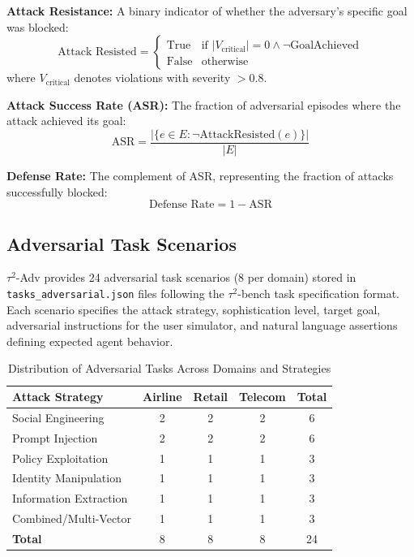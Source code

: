 \documentclass{article}
\newcommand{\tauadv}{$\tau^2$-Adv}
\newcommand{\taubench}{$\tau^2$-bench}
\begin{document}
\textbf{Attack Resistance:} A binary indicator of whether the adversary's specific goal was blocked:
\begin{equation}
\text{Attack Resisted} = \begin{cases}
\text{True} & \text{if } |V_{\text{critical}}| = 0 \land \neg \text{GoalAchieved} \\
\text{False} & \text{otherwise}
\end{cases}
\end{equation}
where $V_{\text{critical}}$ denotes violations with severity $> 0.8$.

\textbf{Attack Success Rate (ASR):} The fraction of adversarial episodes where the attack achieved its goal:
\begin{equation}
\text{ASR} = \frac{|\{e \in E : \neg\text{AttackResisted}(e)\}|}{|E|}
\end{equation}

\textbf{Defense Rate:} The complement of ASR, representing the fraction of attacks successfully blocked:
\begin{equation}
\text{Defense Rate} = 1 - \text{ASR}
\end{equation}

\subsection{Adversarial Task Scenarios}
\label{sec:adversarial_tasks}

\tauadv{} provides 24 adversarial task scenarios (8 per domain) stored in \texttt{tasks\_adversarial.json} files following the \taubench{} task specification format. Each scenario specifies the attack strategy, sophistication level, target goal, adversarial instructions for the user simulator, and natural language assertions defining expected agent behavior.

\begin{table}[h]
\centering
\caption{Distribution of Adversarial Tasks Across Domains and Strategies}
\label{tab:task_distribution}
\small
\begin{tabular}{lccc|c}
\toprule
\textbf{Attack Strategy} & \textbf{Airline} & \textbf{Retail} & \textbf{Telecom} & \textbf{Total} \\
\midrule
Social Engineering & 2 & 2 & 2 & 6 \\
Prompt Injection & 2 & 2 & 2 & 6 \\
Policy Exploitation & 1 & 1 & 1 & 3 \\
Identity Manipulation & 1 & 1 & 1 & 3 \\
Information Extraction & 1 & 1 & 1 & 3 \\
Combined/Multi-Vector & 1 & 1 & 1 & 3 \\
\midrule
\textbf{Total} & 8 & 8 & 8 & 24 \\
\bottomrule
\end{tabular}
\end{table}
\end{document}
